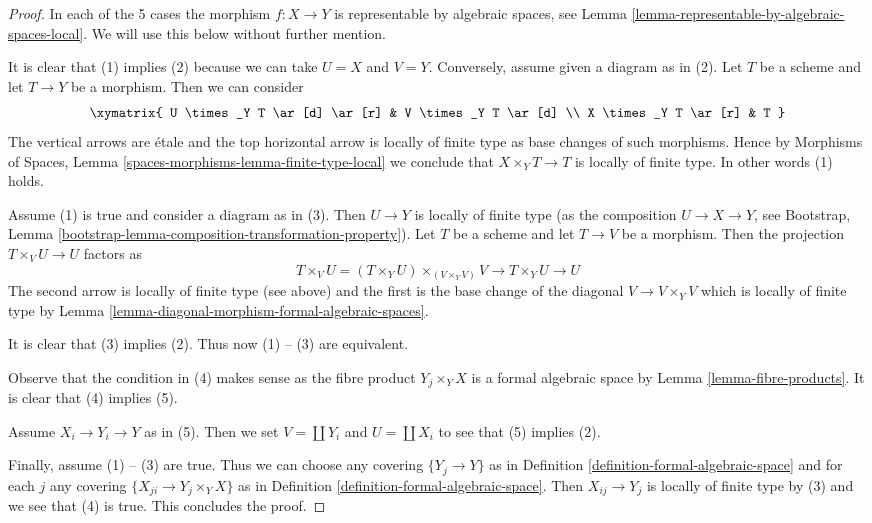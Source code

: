 \begin{proof}
In each of the 5 cases the morphism $f : X \to Y$ is representable
by algebraic spaces, see
Lemma \ref{lemma-representable-by-algebraic-spaces-local}.
We will use this below without further mention.

\medskip\noindent
It is clear that (1) implies (2) because we can take $U = X$ and $V = Y$.
Conversely, assume given a diagram as in (2). Let $T$ be a scheme and
let $T \to Y$ be a morphism. Then we can consider
$$
\xymatrix{
U \times_Y T \ar[d] \ar[r] & V \times_Y T \ar[d] \\
X \times_Y T \ar[r] & T
}
$$
The vertical arrows are \'etale and the top horizontal arrow
is locally of finite type as base changes of such morphisms.
Hence by Morphisms of Spaces, Lemma
\ref{spaces-morphisms-lemma-finite-type-local} we conclude that
$X \times_Y T \to T$ is locally of finite type. In other words
(1) holds.

\medskip\noindent
Assume (1) is true and consider a diagram as in (3).
Then $U \to Y$ is locally of finite type
(as the composition $U \to X \to Y$, see
Bootstrap, Lemma \ref{bootstrap-lemma-composition-transformation-property}).
Let $T$ be a scheme and let $T \to V$ be a morphism.
Then the projection $T \times_V U \to U$ factors as
$$
T \times_V U = (T \times_Y U) \times_{(V \times_Y V)} V
\to T \times_Y U \to U
$$
The second arrow is locally of finite type (see above) and
the first is the base change of the diagonal $V \to V \times_Y V$
which is locally of finite type by
Lemma \ref{lemma-diagonal-morphism-formal-algebraic-spaces}.

\medskip\noindent
It is clear that (3) implies (2). Thus now (1) -- (3) are equivalent.

\medskip\noindent
Observe that the condition in (4) makes sense as the fibre product
$Y_j \times_Y X$ is a formal algebraic space by
Lemma \ref{lemma-fibre-products}.
It is clear that (4) implies (5).

\medskip\noindent
Assume $X_i \to Y_i \to Y$ as in (5). Then we set
$V = \coprod Y_i$ and $U = \coprod X_i$ to see that
(5) implies (2).

\medskip\noindent
Finally, assume (1) -- (3) are true.
Thus we can choose any covering $\{Y_j \to Y\}$ as in
Definition \ref{definition-formal-algebraic-space}
and for each $j$ any covering $\{X_{ji} \to Y_j \times_Y X\}$ as in
Definition \ref{definition-formal-algebraic-space}.
Then $X_{ij} \to Y_j$ is locally of finite type by (3)
and we see that (4) is true. This concludes the proof.
\end{proof}


